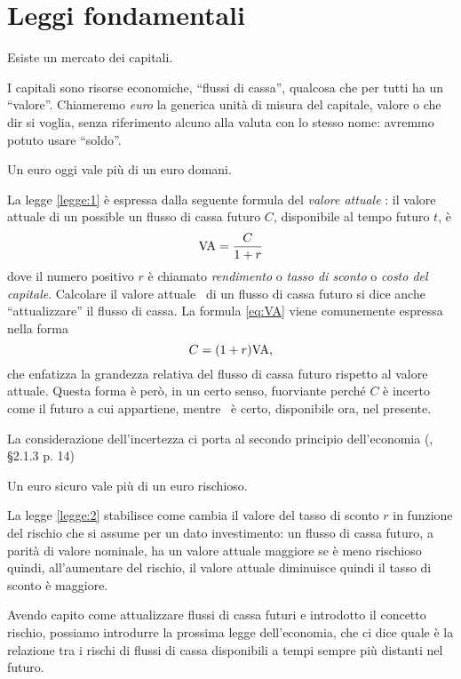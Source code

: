 
\chapter{Leggi fondamentali}
\label{chap:Leggi_fondamentali}

\begin{legge}\label{law:0}
  Esiste un mercato dei capitali.
\end{legge}
I capitali sono risorse economiche, ``flussi di cassa'', qualcosa che per tutti ha un ``valore''.
Chiameremo \emph{euro} la generica unità di misura del capitale, valore o che dir si voglia, senza
riferimento alcuno alla valuta con lo stesso nome: avremmo potuto usare ``soldo''.

\begin{legge}\label{legge:1}
  Un euro oggi vale più di un euro domani.
\end{legge}
La legge \ref{legge:1} è espressa dalla seguente formula del \emph{valore attuale}
\VA: il valore attuale di un possible un flusso di cassa futuro $C$, disponibile
al tempo futuro $t$, è
\begin{equation}
  \label{eq:VA}
  \mathrm{VA}=\frac{C}{1+r}
\end{equation}
dove il numero positivo $r$ è chiamato \emph{rendimento} o \emph{tasso di sconto} o
\emph{costo del capitale}. Calcolare il valore attuale \VA\ di un flusso di cassa futuro
si dice anche ``attualizzare'' il flusso di cassa.
La formula \eqref{eq:VA} viene comunemente espressa nella forma 
\[
  C=(1+r)\mathrm{VA},
\]
che enfatizza la grandezza relativa del flusso di cassa futuro rispetto al valore attuale.
Questa forma è però, in un certo senso, fuorviante perché $C$ è incerto come il futuro a
cui appartiene, mentre \VA\ è certo, disponibile ora, nel presente.

La considerazione dell'incertezza ci porta al secondo
principio dell'economia (\cite{brealey_et_al1999}, §2.1.3 p. 14)

\begin{legge}\label{legge:2}
  Un euro sicuro vale più di un euro rischioso.  
\end{legge}
La legge \ref{legge:2} stabilisce come cambia il valore del tasso di sconto $r$ in funzione del
rischio che si assume per un dato investimento: un flusso di cassa futuro, a parità di valore nominale,
ha un valore attuale maggiore se è meno rischioso quindi, all'aumentare del rischio, il valore attuale
diminuisce quindi il tasso di sconto è maggiore.

Avendo capito come attualizzare flussi di cassa futuri e introdotto il concetto rischio, possiamo introdurre
la prossima legge dell'economia, che ci dice quale è la relazione tra i rischi di flussi di cassa disponibili
a tempi sempre più distanti nel futuro.

